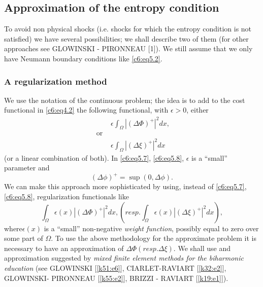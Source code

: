 \subsection{Approximation of the entropy condition}\label{c6:ss5.3}

To avoid non physical shocks (i.e. shocks for which the entropy 
condition is not satisfied) we have several possibilities; we shall 
describe two of them (for other approaches see GLOWINSKI - PIRONNEAU 
[1]). We still assume that we only have Neumann boundary conditions 
like \eqref{c6:eq5.2}.    

\subsubsection{A regularization method}\label{c6:sss5.3.1}

We use the notation of the continuous problem; the idea is to add to 
the cost functional in \eqref{c6:eq4.2} the following functional, with 
$\epsilon > 0$, either   
\begin{align*}
& \epsilon \int_\Omega | (\Delta \Phi )^+ |^2 dx, 
\tag{5.7}\label{c6:eq5.7}\\ 
\text{ or }\\
&\epsilon \int_\Omega | (\Delta \xi )^+ |^2 dx 
\tag{5.8}\label{c6:eq5.8} 
\end{align*}
(or a linear combination of both). In \eqref{c6:eq5.7}, 
\eqref{c6:eq5.8}, $\epsilon $ is a ``small'' parameter and  
\begin{equation}
(\Delta \phi )^+ = \sup (0, \Delta \phi ). \tag{5.9}\label{c6:eq5.9} 
\end{equation}
We can make this approach more sophisticated by using, instead of 
\eqref{c6:eq5.7}, \eqref{c6:eq5.8}, regularization functionals like 
\begin{equation}
\int_\Omega \epsilon (x) | (\Delta \Phi )^+ |^2 dx, (resp. 
\int_\Omega \epsilon (x) | (\Delta \xi )^+ |^2 dx), 
\tag{5.10}\label{c6:eq5.10}  
\end{equation}
where\pageoriginale  $\epsilon (x)$ is a ``small'' non-negative \textit{weight 
function}, possibly equal to zero over some part of $\Omega$. To use 
the above methodology for the approximate problem it is necessary to 
have an approximation of $\Delta \Phi (resp. \Delta \xi)$. We shall use 
and approximation suggested by \textit{mixed finite element methods for 
the biharmonic education} (see GLOWINSKI [\ref{k51:e6}],
CIARLET-RAVIART [\ref{k32:e2}], 
GLOWINSKI- PIRONNEAU [\ref{k55:e2}], BRIZZI - RAVIART [\ref{k19:e1}]).      

